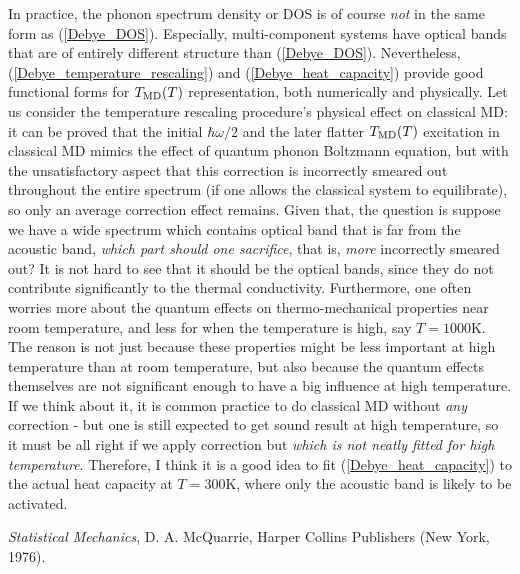 \documentclass[12pt]{article}
\begin{document}
In practice, the phonon spectrum density or DOS is of course {\em not}
in the same form as (\ref{Debye_DOS}). Especially, multi-component
systems have optical bands that are of entirely different structure
than (\ref{Debye_DOS}). Nevertheless,
(\ref{Debye_temperature_rescaling}) and (\ref{Debye_heat_capacity})
provide good functional forms for $T_{\rm MD}(T)$ representation, both
numerically and physically. Let us consider the temperature rescaling
procedure's physical effect on classical MD: it can be proved that the
initial $\hbar\omega/2$ and the later flatter $T_{\rm MD}(T)$
excitation in classical MD mimics the effect of quantum phonon
Boltzmann equation, but with the unsatisfactory aspect that this
correction is incorrectly smeared out throughout the entire spectrum
(if one allows the classical system to equilibrate), so only an
average correction effect remains.  Given that, the question is
suppose we have a wide spectrum which contains optical band that is
far from the acoustic band, {\em which part should one sacrifice},
that is, {\em more} incorrectly smeared out?  It is not hard to see
that it should be the optical bands, since they do not contribute
significantly to the thermal conductivity. Furthermore, one often
worries more about the quantum effects on thermo-mechanical properties
near room temperature, and less for when the temperature is high, say
$T=1000$K. The reason is not just because these properties might be
less important at high temperature than at room temperature, but also
because the quantum effects themselves are not significant enough to
have a big influence at high temperature. If we think about it, it is
common practice to do classical MD without {\em any} correction - but
one is still expected to get sound result at high temperature, so it
must be all right if we apply correction but {\em which is not neatly
fitted for high temperature}. Therefore, I think it is a good idea to
fit (\ref{Debye_heat_capacity}) to the actual heat capacity at
$T=300$K, where only the acoustic band is likely to be activated.

\begin{thebibliography}{00}
\begin{singlespace}
 {\em Statistical Mechanics}, D. A. McQuarrie,
Harper Collins Publishers (New York, 1976).
\end{singlespace}
\end{thebibliography}
\end{document}
